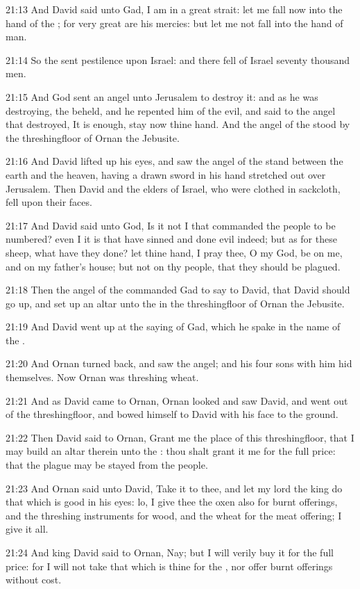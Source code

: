 21:13 And David said unto Gad, I am in a great strait: let me fall now
into the hand of the \LORD; for very great are his mercies: but let me
not fall into the hand of man.

21:14 So the \LORD sent pestilence upon Israel: and there fell of
Israel seventy thousand men.

21:15 And God sent an angel unto Jerusalem to destroy it: and as he
was destroying, the \LORD beheld, and he repented him of the evil, and
said to the angel that destroyed, It is enough, stay now thine hand.
And the angel of the \LORD stood by the threshingfloor of Ornan the
Jebusite.

21:16 And David lifted up his eyes, and saw the angel of the \LORD
stand between the earth and the heaven, having a drawn sword in his
hand stretched out over Jerusalem. Then David and the elders of
Israel, who were clothed in sackcloth, fell upon their faces.

21:17 And David said unto God, Is it not I that commanded the people
to be numbered? even I it is that have sinned and done evil indeed;
but as for these sheep, what have they done? let thine hand, I pray
thee, O \LORD my God, be on me, and on my father's house; but not on
thy people, that they should be plagued.

21:18 Then the angel of the \LORD commanded Gad to say to David, that
David should go up, and set up an altar unto the \LORD in the
threshingfloor of Ornan the Jebusite.

21:19 And David went up at the saying of Gad, which he spake in the
name of the \LORD.

21:20 And Ornan turned back, and saw the angel; and his four sons with
him hid themselves. Now Ornan was threshing wheat.

21:21 And as David came to Ornan, Ornan looked and saw David, and went
out of the threshingfloor, and bowed himself to David with his face to
the ground.

21:22 Then David said to Ornan, Grant me the place of this
threshingfloor, that I may build an altar therein unto the \LORD: thou
shalt grant it me for the full price: that the plague may be stayed
from the people.

21:23 And Ornan said unto David, Take it to thee, and let my lord the
king do that which is good in his eyes: lo, I give thee the oxen also
for burnt offerings, and the threshing instruments for wood, and the
wheat for the meat offering; I give it all.

21:24 And king David said to Ornan, Nay; but I will verily buy it for
the full price: for I will not take that which is thine for the \LORD,
nor offer burnt offerings without cost.

